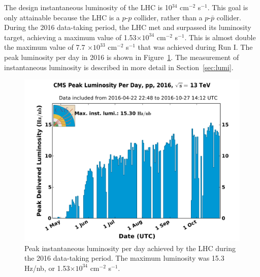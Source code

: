 The design instantaneous luminosity of the LHC is 10$^{34}$ cm$^{-2}$ s$^{-1}$. This goal is only attainable because the LHC is a $p$-$p$ collider, rather than a $p$-$\bar{p}$ collider. During the 2016 data-taking period, the LHC met and surpassed its luminosity target, achieving a maximum value of 1.53$\times 10^{34}$ cm$^{-2}$ s$^{-1}$. This is almost double the maximum value of 7.7 $\times 10^{33}$ cm$^{-2}$ s$^{-1}$ that was achieved during Run I. The peak luminosity per day in 2016 is shown in Figure~\ref{fig:instLumi}. The measurement of instantaneous luminosity is described in more detail in Section~\ref{sec:lumi}. 

\begin{figure}[h!]
	\centering
	\includegraphics[width=\linewidth]{Figures/LHC/peak_lumi_per_day_pp_2016.pdf}
       \caption{Peak instantaneous luminosity per day achieved by the LHC during the 2016 data-taking period. 
       The maximum luminosity was 15.3 Hz/nb, or 1.53$\times 10^{34}$ cm$^{-2}$ s$^{-1}$. }
       \label{fig:instLumi}
\end{figure}





